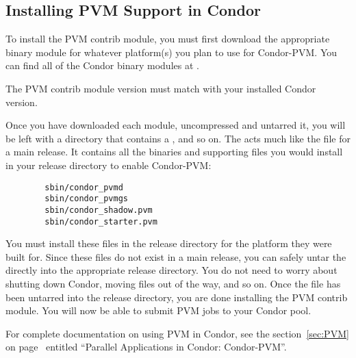 \subsection{\label{sec:Install-PVM-Condor}
Installing PVM Support in Condor} 


To install the PVM contrib module, you must first download the
appropriate binary module for whatever platform(s) you plan to use for 
Condor-PVM.
You can find all of the Condor binary modules at
.

\Note The PVM contrib module version must match with your installed
Condor version.

Once you have downloaded each module, uncompressed and untarred it,
you will be left with a directory that contains a ,
 and so on.
The  acts much like the  file for a
main release.
It contains all the binaries and supporting files you would install in
your release directory to enable Condor-PVM:
\begin{verbatim}
        sbin/condor_pvmd
        sbin/condor_pvmgs
        sbin/condor_shadow.pvm
        sbin/condor_starter.pvm
\end{verbatim}

You must install these files in the release directory for the platform
they were built for.  
Since these files do not exist in a main release, you can safely untar
the  directly into the appropriate release directory.
You do not need to worry about shutting down Condor, moving files out
of the way, and so on.
Once the  file has been untarred into the release
directory, you are done installing the PVM contrib module.
You will now be able to submit PVM jobs to your Condor pool.  

For complete documentation on using PVM in Condor, see the
section~\ref{sec:PVM} on page~\pageref{sec:PVM} entitled ``Parallel
Applications in Condor: Condor-PVM''. 
